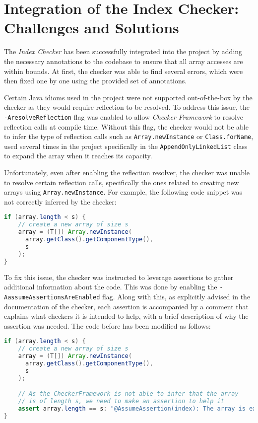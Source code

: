 \documentclass[a4paper, 11pt]{article}
\begin{document}
\pagebreak

\section{Integration of the Index Checker: Challenges and Solutions}

The \textit{Index Checker} has been successfully integrated into the project by adding the necessary annotations to the codebase to ensure that all array accesses are within bounds. At first, the checker was able to find several errors, which were then fixed one by one using the provided set of annotations.

Certain Java idioms used in the project were not supported out-of-the-box by the checker as they would require reflection to be resolved. To address this issue, the \texttt{-AresolveReflection} flag was enabled to allow \textit{Checker Framework} to resolve reflection calls at compile time. Without this flag, the checker would not be able to infer the type of reflection calls such as \texttt{Array.newInstance} or \texttt{Class.forName}, used several times in the project specifically in the \texttt{AppendOnlyLinkedList} class to expand the array when it reaches its capacity.

Unfortunately, even after enabling the reflection resolver, the checker was unable to resolve certain reflection calls, specifically the ones related to creating new arrays using \texttt{Array.newInstance}. For example, the following code snippet was not correctly inferred by the checker:

\begin{lstlisting}[language=java,breaklines=true,caption={Reflection call to create a new array},label={lst:reflection-array},captionpos=b]
if (array.length < s) {
    // create a new array of size s
    array = (T[]) Array.newInstance(
      array.getClass().getComponentType(),
      s
    );
}
\end{lstlisting}

To fix this issue, the checker was instructed to leverage assertions to gather additional information about the code. This was done by enabling the \texttt{-AassumeAssertionsAreEnabled} flag. Along with this, as explicitly advised in the documentation of the checker, each assertion is accompanied by a comment that explains what checkers it is intended to help, with a brief description of why the assertion was needed. The code before has been modified as follows:

\begin{lstlisting}[language=java,breaklines=true,caption={Using assertions to help the Index Checker infer the array length},label={lst:array-length},captionpos=b]
if (array.length < s) {
    // create a new array of size s
    array = (T[]) Array.newInstance(
      array.getClass().getComponentType(),
      s
    );

    // As the CheckerFramework is not able to infer that the array
    // is of length s, we need to make an assertion to help it
    assert array.length == s: "@AssumeAssertion(index): The array is exactly of length s, as we have just created it";
}
\end{lstlisting}
\end{document}
